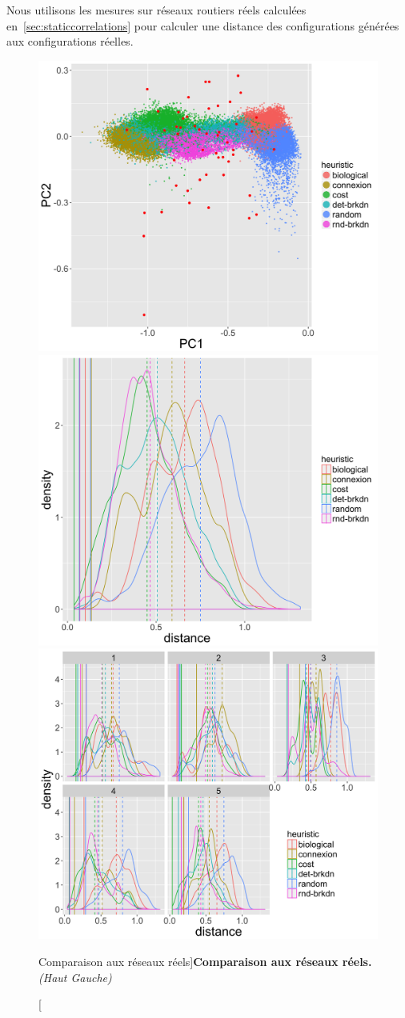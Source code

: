 Nous utilisons les mesures sur réseaux routiers réels calculées en~\ref{sec:staticcorrelations} pour calculer une distance des configurations générées aux configurations réelles.




\begin{figure}
\includegraphics[width=0.45\linewidth]{Figures/NetworkGrowth/feasible_space_withreal_pca}
\includegraphics[width=0.45\linewidth]{Figures/NetworkGrowth/distance_real}\\
\includegraphics[width=0.8\linewidth]{Figures/NetworkGrowth/distance_real_bymorph}
\caption[][Comparaison aux réseaux réels]{}{\textbf{Comparaison aux réseaux réels.} \textit{(Haut Gauche)}\label{fig:networkgrowth:realdistance}}
\end{figure}



